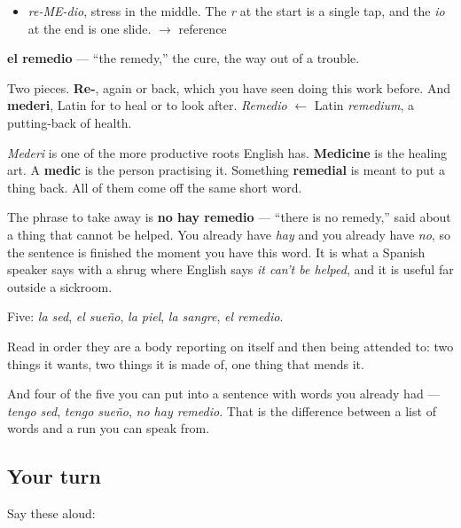 \begin{sounds}
\begin{itemize}
\raggedright
  \item \emph{re-ME-dio}, stress in the middle. The \emph{r} at the start is a single tap, and the \emph{io} at the end is one slide. $\to$ reference
\end{itemize}
\end{sounds}

\begin{cousinweb}
\textbf{el remedio} — \textquotedblleft{}the remedy,\textquotedblright{} the cure, the way out of a trouble.

Two pieces. \textbf{Re-}, again or back, which you have seen doing this work before. And \textbf{mederi}, Latin for to heal or to look after. \emph{Remedio} $\leftarrow$ Latin \emph{remedium}, a putting-back of health.

\emph{Mederi} is one of the more productive roots English has. \textbf{Medicine} is the healing art. A \textbf{medic} is the person practising it. Something \textbf{remedial} is meant to put a thing back. All of them come off the same short word.

The phrase to take away is \textbf{no hay remedio} — \textquotedblleft{}there is no remedy,\textquotedblright{} said about a thing that cannot be helped. You already have \emph{hay} and you already have \emph{no}, so the sentence is finished the moment you have this word. It is what a Spanish speaker says with a shrug where English says \emph{it can't be helped}, and it is useful far outside a sickroom.
\end{cousinweb}

\begin{grammarlens}[title={What you've built}]
Five: \emph{la sed}, \emph{el sueño}, \emph{la piel}, \emph{la sangre}, \emph{el remedio}.

Read in order they are a body reporting on itself and then being attended to: two things it wants, two things it is made of, one thing that mends it.

And four of the five you can put into a sentence with words you already had — \emph{tengo sed}, \emph{tengo sueño}, \emph{no hay remedio}. That is the difference between a list of words and a run you can speak from.
\end{grammarlens}

\subsection*{Your turn}
Say these aloud:

